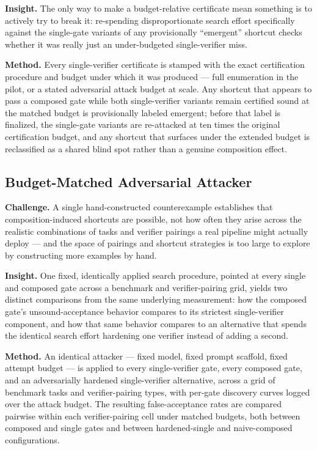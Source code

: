 \documentclass[11pt]{article}
\begin{document}
\textbf{Insight.} The only way to make a budget-relative certificate mean something is to actively try to break it: re-spending disproportionate search effort specifically against the single-gate variants of any provisionally ``emergent'' shortcut checks whether it was really just an under-budgeted single-verifier miss.

\textbf{Method.} Every single-verifier certificate is stamped with the exact certification procedure and budget under which it was produced --- full enumeration in the pilot, or a stated adversarial attack budget at scale. Any shortcut that appears to pass a composed gate while both single-verifier variants remain certified sound at the matched budget is provisionally labeled emergent; before that label is finalized, the single-gate variants are re-attacked at ten times the original certification budget, and any shortcut that surfaces under the extended budget is reclassified as a shared blind spot rather than a genuine composition effect.

\subsection{Budget-Matched Adversarial Attacker}
\textbf{Challenge.} A single hand-constructed counterexample establishes that composition-induced shortcuts are possible, not how often they arise across the realistic combinations of tasks and verifier pairings a real pipeline might actually deploy --- and the space of pairings and shortcut strategies is too large to explore by constructing more examples by hand.

\textbf{Insight.} One fixed, identically applied search procedure, pointed at every single and composed gate across a benchmark and verifier-pairing grid, yields two distinct comparisons from the same underlying measurement: how the composed gate's unsound-acceptance behavior compares to its strictest single-verifier component, and how that same behavior compares to an alternative that spends the identical search effort hardening one verifier instead of adding a second.

\textbf{Method.} An identical attacker --- fixed model, fixed prompt scaffold, fixed attempt budget --- is applied to every single-verifier gate, every composed gate, and an adversarially hardened single-verifier alternative, across a grid of benchmark tasks and verifier-pairing types, with per-gate discovery curves logged over the attack budget. The resulting false-acceptance rates are compared pairwise within each verifier-pairing cell under matched budgets, both between composed and single gates and between hardened-single and naive-composed configurations.
\end{document}
